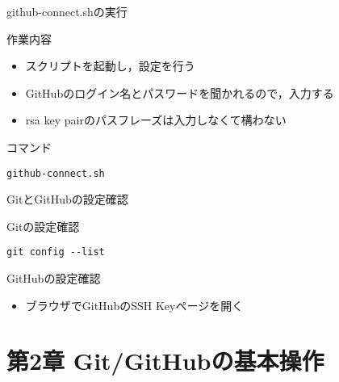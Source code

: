 \documentclass[t, aspectratio=169]{beamer}
\begin{document}
\begin{frame}[fragile,label=sec-1-5-6]{github-connect.shの実行}
 \begin{block}{作業内容}
\begin{itemize}
\item スクリプトを起動し，設定を行う
\item GitHubのログイン名とパスワードを聞かれるので，入力する
\item rsa key pairのパスフレーズは入力しなくて構わない
\end{itemize}
\end{block}

\begin{block}{コマンド}
\begin{verbatim}
github-connect.sh
\end{verbatim}
\end{block}
\end{frame}
\begin{frame}[fragile,label=sec-1-5-7]{GitとGitHubの設定確認}
 \begin{block}{Gitの設定確認}
\begin{verbatim}
git config --list
\end{verbatim}
\end{block}

\begin{block}{GitHubの設定確認}
\begin{itemize}
\item ブラウザでGitHubのSSH Keyページを開く
\end{itemize}
\end{block}
\end{frame}
\part{第2章 Git/GitHubの基本操作}
\label{sec-2}
\end{document}
